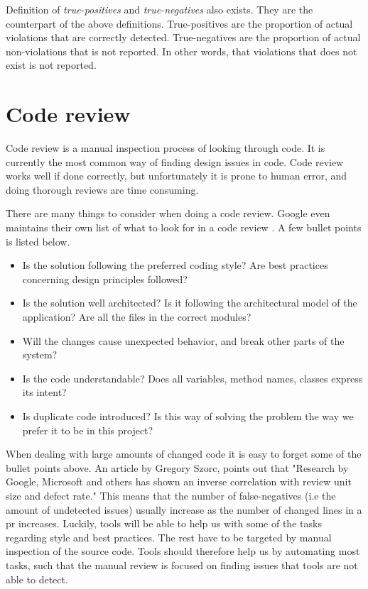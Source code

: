 \documentclass[pdftex,10pt,b5paper,twoside]{report}
\begin{document}
Definition of \textit{true-positives} and \textit{true-negatives} also exists. They are the counterpart of the above definitions. True-positives are the proportion of actual violations that are correctly detected. True-negatives are the proportion of actual non-violations that is not reported. In other words, that violations that does not exist is not reported. 



\section{Code review}
\label{code-review}
Code review is a manual inspection process of looking through code. It is currently the most common way of finding design issues in code. Code review works well if done correctly, but unfortunately it is prone to human error, and doing thorough reviews are time consuming.

There are many things to consider when doing a code review. Google even maintains their own list of what to look for in a code review \cite{google-codereview}. A few bullet points is listed below.

\begin{itemize}
    \item Is the solution following the preferred coding style? Are best practices concerning design principles followed?
    
    \item Is the solution well architected? Is it following the architectural model of the application? Are all the files in the correct modules?
    
    \item Will the changes cause unexpected behavior, and break other parts of the system? 
    
    \item Is the code understandable? Does all variables, method names, classes express its intent?
    
     \item Is duplicate code introduced? Is this way of solving the problem the way we prefer it to be in this project?
\end{itemize}

When dealing with large amounts of changed code it is easy to forget some of the bullet points above. An article by Gregory Szorc\cite{gregory}, points out that "Research by Google, Microsoft and others has shown an inverse correlation with review unit size and defect rate." This means that the number of false-negatives (i.e the amount of undetected issues) usually increase as the number of changed lines in a \gls{pr} increases. Luckily, tools will be able to help us with some of the tasks regarding style and best practices. The rest have to be targeted by manual inspection of the source code. Tools should therefore help us by automating most tasks, such that the manual review is focused on finding issues that tools are not able to detect. 
\end{document}
